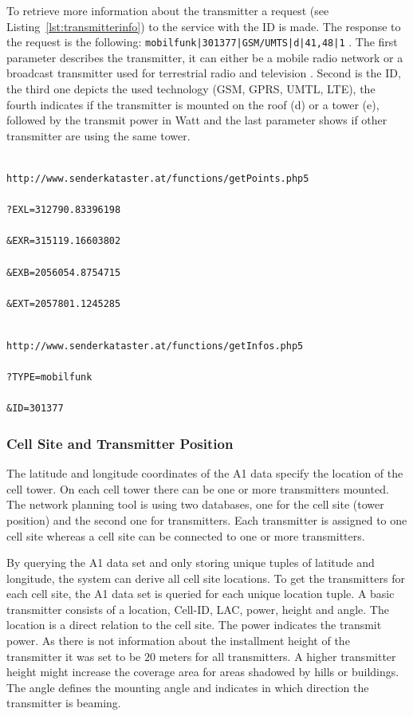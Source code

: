 \documentclass[master,english]{hgbthesis}
\begin{document}
To retrieve more information about the transmitter a request (see Listing~\ref{lst:transmitterinfo}) to the service with the ID is made. The response to the request is the following: \lstinline+mobilfunk|301377|GSM/UMTS|d|41,48|1+ . The first parameter describes the transmitter, it can either be a mobile radio network or a broadcast transmitter used for terrestrial radio and television . Second is the ID, the third one depicts the used technology (GSM, GPRS, UMTL, LTE), the fourth indicates if the transmitter is mounted on the roof (d) or a tower (e), followed by the transmit power in Watt and the last parameter shows if other transmitter are using the same tower.

\begin{lstlisting}[caption=Request to retrieve station within the boudning box,label=lst:senderbbox]

http://www.senderkataster.at/functions/getPoints.php5

?EXL=312790.83396198

&EXR=315119.16603802

&EXB=2056054.8754715

&EXT=2057801.1245285

\end{lstlisting}

\begin{lstlisting}[caption=Request to retrieve transmitter information,label=lst:transmitterinfo]

http://www.senderkataster.at/functions/getInfos.php5

?TYPE=mobilfunk

&ID=301377

\end{lstlisting}

\subsubsection{Cell Site and Transmitter Position}

The latitude and longitude coordinates of the A1 data specify the location of the cell tower. On each cell tower there can be one or more transmitters mounted. The network planning tool is using two databases, one for the cell site (tower position) and the second one for transmitters. Each transmitter is assigned to one cell site whereas a cell site can be connected to one or more transmitters.

By querying the A1 data set and only storing unique tuples of latitude and longitude, the system can derive all cell site locations. To get the transmitters for each cell site, the A1 data set is queried for each unique location tuple. A basic transmitter consists of a location, Cell-ID, LAC, power, height and angle. The location is a direct relation to the cell site. The power indicates the transmit power. As there is not information about the installment height of the transmitter it was set to be $20$ meters for all transmitters. A higher transmitter height might increase the coverage area for areas shadowed by hills or buildings. The angle defines the mounting angle and indicates in which direction the transmitter is beaming.
\end{document}
